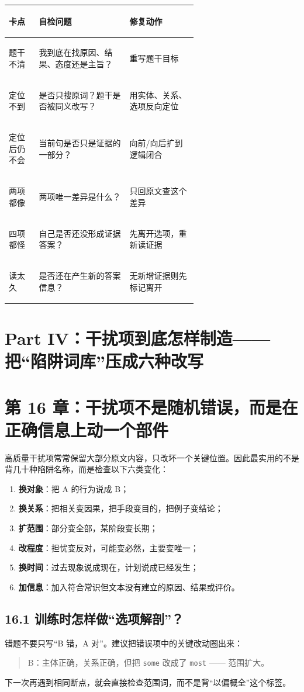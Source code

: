 \documentclass[11pt,a4paper]{ctexart}
\newcommand{\kw}[1]{\textbf{#1}}
\begin{document}
\begin{center}
\small
\begin{tabularx}{\linewidth}{>{\bfseries\raggedright\arraybackslash}p{0.16\linewidth} >{\raggedright\arraybackslash}p{0.48\linewidth} Y}
\toprule
卡点 & 自检问题 & 修复动作 \\
\midrule
题干不清 & 我到底在找原因、结果、态度还是主旨？ & 重写题干目标 \\
定位不到 & 是否只搜原词？题干是否被同义改写？ & 用实体、关系、选项反向定位 \\
定位后仍不会 & 当前句是否只是证据的一部分？ & 向前/向后扩到逻辑闭合 \\
两项都像 & 两项唯一差异是什么？ & 只回原文查这个差异 \\
四项都怪 & 自己是否还没形成证据答案？ & 先离开选项，重新读证据 \\
读太久 & 是否还在产生新的答案信息？ & 无新增证据则先标记离开 \\
\bottomrule
\end{tabularx}
\end{center}

\newpage
\section{Part IV：干扰项到底怎样制造——把“陷阱词库”压成六种改写}

\section{第 16 章：干扰项不是随机错误，而是在正确信息上动一个部件}
高质量干扰项常常保留大部分原文内容，只改坏一个关键位置。因此最实用的不是背几十种陷阱名称，而是检查以下六类变化：

\begin{enumerate}
  \item \kw{换对象}：把 A 的行为说成 B；
  \item \kw{换关系}：把相关变因果，把手段变目的，把例子变结论；
  \item \kw{扩范围}：部分变全部，某阶段变长期；
  \item \kw{改程度}：担忧变反对，可能变必然，主要变唯一；
  \item \kw{换时间}：过去现象说成现在，计划说成已经发生；
  \item \kw{加信息}：加入符合常识但文本没有建立的原因、结果或评价。
\end{enumerate}

\subsection{16.1 训练时怎样做“选项解剖”？}
错题不要只写“B 错，A 对”。建议把错误项中的关键改动圈出来：
\begin{quote}
B：主体正确，关系正确，但把 \texttt{some} 改成了 \texttt{most} —— 范围扩大。
\end{quote}
下一次再遇到相同断点，就会直接检查范围词，而不是背“以偏概全”这个标签。
\end{document}
